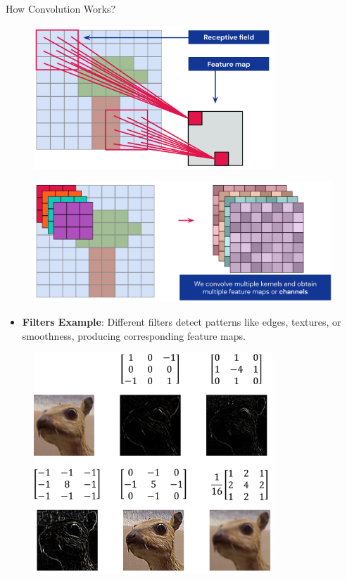 \documentclass[10pt]{beamer}
\theoremstyle{remark}
\theoremstyle{definition}
\begin{document}
\begin{frame}[allowframebreaks]{How Convolution Works?}
\begin{figure}
\centering
\includegraphics[width=0.8\textwidth,height=0.8\textheight,keepaspectratio]{./images/conv_10.png}
\end{figure}

\framebreak

\begin{figure}
\centering
\includegraphics[width=1.0\textwidth,height=0.9\textheight,keepaspectratio]{./images/conv_11.png}
\end{figure}

\framebreak

\begin{itemize}
\item \textbf{Filters Example}: Different filters detect patterns like edges, textures, or smoothness, producing corresponding feature maps.
\end{itemize}

\begin{figure}
\centering
\includegraphics[width=0.8\textwidth,height=0.8\textheight,keepaspectratio]{./images/conv_12.png}
\end{figure}


\end{frame}
\end{document}
